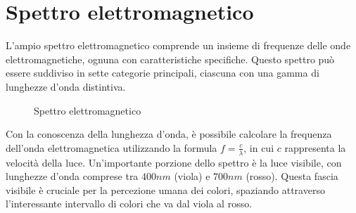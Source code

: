 
\section{Spettro elettromagnetico}

L'ampio spettro elettromagnetico comprende un insieme di frequenze delle onde elettromagnetiche, ognuna con caratteristiche specifiche.
Questo spettro può essere suddiviso in sette categorie principali, ciascuna con una gamma di lunghezze d'onda distintiva.

\begin{figure}[H]
    \centering
    \caption{Spettro elettromagnetico}
\end{figure}

Con la conoscenza della lunghezza d'onda, è possibile calcolare la frequenza dell'onda elettromagnetica utilizzando la formula $f = \frac{c}{\lambda}$, in cui $c$ rappresenta la velocità della luce.
Un'importante porzione dello spettro è la luce visibile, con lunghezze d'onda comprese tra $400nm$ (viola) e $700nm$ (rosso).
Questa fascia visibile è cruciale per la percezione umana dei colori, spaziando attraverso l'interessante intervallo di colori che va dal viola al rosso.